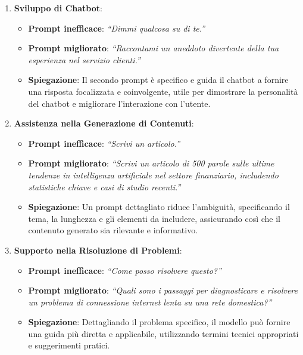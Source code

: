             \begin{enumerate}[start=1,label={\bfseries{}E\arabic*.}]
                \item \textbf{Sviluppo di Chatbot}:
                    \begin{itemize}
                        \item \textbf{Prompt inefficace}: \textit{``Dimmi qualcosa su di te.''}
                        \item \textbf{Prompt migliorato}: \textit{``Raccontami un aneddoto divertente della tua esperienza nel servizio clienti.''}
                        \item \textbf{Spiegazione}: Il secondo prompt è specifico e guida il chatbot a fornire una risposta focalizzata e coinvolgente, utile per dimostrare la personalità del chatbot e migliorare l'interazione con l'utente.
                    \end{itemize}
                    
                \item \textbf{Assistenza nella Generazione di Contenuti}:
                    \begin{itemize}
                        \item \textbf{Prompt inefficace}: \textit{``Scrivi un articolo.''}
                        \item \textbf{Prompt migliorato}: \textit{``Scrivi un articolo di 500 parole sulle ultime tendenze in intelligenza artificiale nel settore finanziario, includendo statistiche chiave e casi di studio recenti.''}
                        \item \textbf{Spiegazione}: Un prompt dettagliato riduce l'ambiguità, specificando il tema, la lunghezza e gli elementi da includere, assicurando così che il contenuto generato sia rilevante e informativo.
                    \end{itemize}

                \item \textbf{Supporto nella Risoluzione di Problemi}:
                    \begin{itemize}
                        \item \textbf{Prompt inefficace}: \textit{``Come posso risolvere questo?''}
                        \item \textbf{Prompt migliorato}: \textit{``Quali sono i passaggi per diagnosticare e risolvere un problema di connessione internet lenta su una rete domestica?''}
                        \item \textbf{Spiegazione}: Dettagliando il problema specifico, il modello può fornire una guida più diretta e applicabile, utilizzando termini tecnici appropriati e suggerimenti pratici.
                    \end{itemize}
            \end{enumerate}
